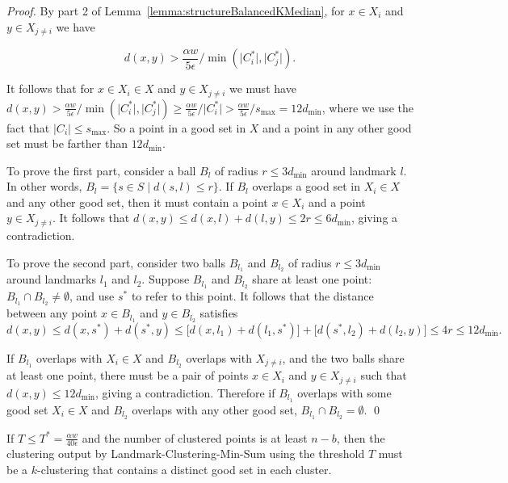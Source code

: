 \documentclass{llncs} \usepackage{algorithm}
\begin{document}
\begin{proof}

By part 2 of Lemma~\ref{lemma:structureBalancedKMedian}, for $x \in X_{i}$ and $y \in X_{j \ne i}$ we have

\begin{displaymath}
d(x,y) > \frac{\alpha w}{5 \epsilon}/ \min(\vert C_{i}^{\ast} \vert, \vert C_{j}^{\ast} \vert).
\end{displaymath}

It follows that for $x \in X_{i} \in X$ and $y \in X_{j \ne i}$ we must have $d(x,y) > \frac{\alpha w}{5 \epsilon}/ \min(\vert C_{i}^{\ast} \vert, \vert C_{j}^{\ast} \vert) \ge \frac{\alpha w}{5 \epsilon}/ \vert C_{i}^{\ast} \vert > \frac{\alpha w}{5 \epsilon} / s_{\max} = 12d_{\min}$, where we use the fact that $\vert C_{i} \vert \le s_{\max}$.  So a point in a good set in $X$ and a point in any other good set must be farther than $12d_{\min}$.

To prove the first part, consider a ball $B_{l}$ of radius $r \le 3 d_{\min}$ around landmark $l$.  In other words, $B_{l} = \lbrace s \in S
\mid d(s,l) \le r \rbrace$.  If $B_{l}$ overlaps a good set in $X_{i} \in X$ and any other good set, then it must contain a point $x \in X_{i}$ and a point $y \in X_{j \ne i}$.  It follows that $d(x,y) \le d(x,l) + d(l,y) \le 2r \le 6 d_{\min}$, giving a contradiction.

To prove the second part, consider two balls $B_{l_{1}}$ and $B_{l_{2}}$ of
radius $r \le 3 d_{\min}$ around landmarks $l_{1}$ and $l_{2}$.  Suppose $B_{l_{1}}$ and $B_{l_{2}}$ share at least one
point: $B_{l_{1}} \cap B_{l_{2}} \ne \emptyset$, and use $s^{\ast}$ to refer to
this point. It follows that the distance between any
point $x \in B_{l_{1}}$ and $y \in B_{l_{2}}$ satisfies $d(x,y) \le d(x,s^{\ast})
+ d(s^{\ast},y) \le \lbrack d(x,l_{1}) + d(l_{1},s^{\ast}) \rbrack + \lbrack
d(s^{\ast},l_{2}) + d(l_{2},y) \rbrack \le 4r \le 12 d_{\min}.$

If $B_{l_{1}}$ overlaps with $X_{i} \in X$ and $B_{l_{2}}$ overlaps with $X_{j \ne i}$, and the two balls share at least one point, there must be a pair of points $x \in X_{i}$ and $y \in X_{j \ne i}$ such that $d(x,y) \le 12 d_{\min}$, giving a contradiction.  Therefore if
$B_{l_{1}}$ overlaps with some good set $X_{i} \in X$ and $B_{l_{2}}$ overlaps with any other good set, $B_{l_{1}} \cap
B_{l_{2}} = \emptyset$. \qed


\end{proof}

\begin{lemma}\label{lemma:correctEstimate}
If $T \le T^{\ast} = \frac{\alpha w}{40 \epsilon}$ and the number of clustered points is at least $n-b$, then the clustering output by Landmark-Clustering-Min-Sum using the threshold $T$ must be a $k$-clustering that contains a distinct good set in each cluster.

\end{lemma}
\end{document}
